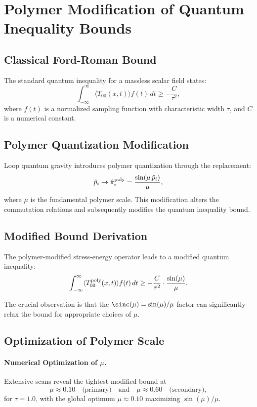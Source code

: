 \documentclass[11pt]{article}
\begin{document}
\section*{Polymer Modification of Quantum Inequality Bounds}

\subsection*{Classical Ford-Roman Bound}
The standard quantum inequality for a massless scalar field states:
\[
  \int_{-\infty}^{\infty} \langle T_{00}(x,t) \rangle f(t)\,dt \geq -\frac{C}{\tau^2},
\]
where $f(t)$ is a normalized sampling function with characteristic width $\tau$, and $C$ is a numerical constant.

\subsection*{Polymer Quantization Modification}
Loop quantum gravity introduces polymer quantization through the replacement:
\[
  \hat{p}_i \rightarrow \hat{\pi}_i^{\rm poly} = \frac{\sin(\mu\,\hat{p}_i)}{\mu},
\]
where $\mu$ is the fundamental polymer scale. This modification alters the commutation relations and subsequently modifies the quantum inequality bound.

\subsection*{Modified Bound Derivation}
The polymer-modified stress-energy operator leads to a modified quantum inequality:
\[
  \int_{-\infty}^{\infty} \langle T_{00}^{\rm poly}(x,t) \rangle f(t)\,dt \geq -\frac{C}{\tau^2} \cdot \frac{\sin(\mu)}{\mu}.
\]

The crucial observation is that the $\sinc(\mu) = \sin(\mu)/\mu$ factor can significantly relax the bound for appropriate choices of $\mu$.

\subsection*{Optimization of Polymer Scale}
\paragraph{Numerical Optimization of $\mu$.}
Extensive scans reveal the tightest modified bound at
\[
  \mu \approx 0.10 \quad\text{(primary)} \quad\text{and}\quad \mu \approx 0.60 \quad\text{(secondary)},
\]
for $\tau=1.0$, with the global optimum $\mu\approx0.10$ maximizing $\sin(\mu)/\mu$.  
\end{document}
